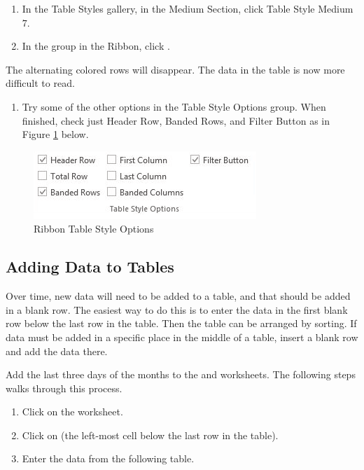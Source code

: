 \begin{enumerate}[resume]
	\item In the Table Styles gallery, in the Medium Section, click Table Style Medium $ 7 $.
	\item In the  group in the Ribbon, click .
\end{enumerate}

The alternating colored rows will disappear. The data in the table is now more difficult to read.

\begin{enumerate}
	\item Try some of the other options in the Table Style Options group. When finished, check just Header Row, Banded Rows, and Filter Button as in Figure \ref{05:fig05} below.
\end{enumerate}

\begin{figure}[H]
	\centering
	\includegraphics[width=\maxwidth{.95\linewidth}]{gfx/ch05_fig05}
	\caption{Ribbon Table Style Options}
	\label{05:fig05}
\end{figure}

\subsection{Adding Data to Tables}

Over time, new data will need to be added to a table, and that should be added in a blank row. The easiest way to do this is to enter the data in the first blank row below the last row in the table. Then the table can be arranged by sorting. If data must be added in a specific place in the middle of a table, insert a blank row and add the data there.

Add the last three days of the months to the  and  worksheets. The following steps walks through this process.

\begin{enumerate}
	\item Click on the  worksheet.
	\item Click on  (the left-most cell below the last row in the table).
	\item Enter the data from the following table.
\end{enumerate}

